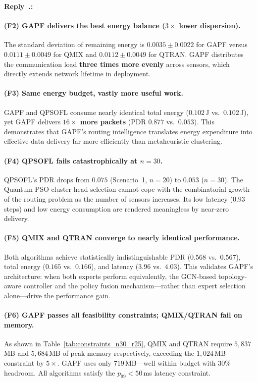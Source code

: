 \documentclass[11pt]{article}
\newcounter{reviewer}
\newcounter{replyctr}[reviewer]
\renewcommand{\thereplyctr}{\thereviewer.\arabic{replyctr}}
\newenvironment{reply}
  {\refstepcounter{replyctr}%
   \addtocounter{replyctr}{-1}%
   \medskip\noindent
   \begin{sf}\textbf{Reply~\thereplyctr:}\ }
  {\addtocounter{replyctr}{1}%
   \medskip\end{sf}}
\begin{document}
\begin{refsection}
\begin{mdframed}[style=Resp]
\begin{reply}
\paragraph{(F2) GAPF delivers the best energy balance ($3\times$ lower dispersion).}
The standard deviation of remaining energy is $0.0035 \pm 0.0022$ for GAPF versus $0.0111 \pm 0.0049$ for QMIX and $0.0112 \pm 0.0049$ for QTRAN. GAPF distributes the communication load \textbf{three times more evenly} across sensors, which directly extends network lifetime in deployment.

\paragraph{(F3) Same energy budget, vastly more useful work.}
GAPF and QPSOFL consume nearly identical total energy ($0.102$\,J vs.\ $0.102$\,J), yet GAPF delivers \textbf{$16\times$ more packets} (PDR $0.877$ vs.\ $0.053$). This demonstrates that GAPF's routing intelligence translates energy expenditure into effective data delivery far more efficiently than metaheuristic clustering.

\paragraph{(F4) QPSOFL fails catastrophically at $n=30$.}
QPSOFL's PDR drops from $0.075$ (Scenario~1, $n=20$) to $0.053$ ($n=30$). The Quantum PSO cluster-head selection cannot cope with the combinatorial growth of the routing problem as the number of sensors increases. Its low latency ($0.93$ steps) and low energy consumption are rendered meaningless by near-zero delivery.

\paragraph{(F5) QMIX and QTRAN converge to nearly identical performance.}
Both algorithms achieve statistically indistinguishable PDR ($0.568$ vs.\ $0.567$), total energy ($0.165$ vs.\ $0.166$), and latency ($3.96$ vs.\ $4.03$). This validates GAPF's architecture: when both experts perform equivalently, the GCN-based topology-aware controller and the policy fusion mechanism---rather than expert selection alone---drive the performance gain.

\paragraph{(F6) GAPF passes all feasibility constraints; QMIX/QTRAN fail on memory.}
As shown in Table~\ref{tab:constraints_n30_r25}, QMIX and QTRAN require $5{,}837$\,MB and $5{,}684$\,MB of peak memory respectively, exceeding the $1{,}024$\,MB constraint by $5\times$. GAPF uses only $719$\,MB---well within budget with 30\% headroom. All algorithms satisfy the $p_{99} < 50$\,ms latency constraint.


\end{reply}
\end{mdframed}
\end{refsection}
\end{document}
